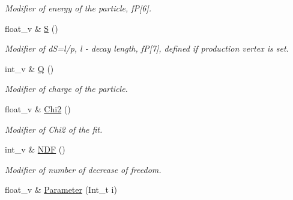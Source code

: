 \begin{DoxyCompactItemize}
\begin{DoxyCompactList}\small\item\em Modifier of energy of the particle, fP\mbox{[}6\mbox{]}. \end{DoxyCompactList}\item 
float\+\_\+v \& \hyperlink{classKFParticleBaseSIMD_ad15ac850401a548df731453f35db64dd}{S} ()\hypertarget{classKFParticleBaseSIMD_ad15ac850401a548df731453f35db64dd}{}\label{classKFParticleBaseSIMD_ad15ac850401a548df731453f35db64dd}

\begin{DoxyCompactList}\small\item\em Modifier of dS=l/p, l -\/ decay length, fP\mbox{[}7\mbox{]}, defined if production vertex is set. \end{DoxyCompactList}\item 
int\+\_\+v \& \hyperlink{classKFParticleBaseSIMD_a710ce08809b254aac583349705151973}{Q} ()\hypertarget{classKFParticleBaseSIMD_a710ce08809b254aac583349705151973}{}\label{classKFParticleBaseSIMD_a710ce08809b254aac583349705151973}

\begin{DoxyCompactList}\small\item\em Modifier of charge of the particle. \end{DoxyCompactList}\item 
float\+\_\+v \& \hyperlink{classKFParticleBaseSIMD_ae203be3b49c5af07d2ee3d895a2f21dc}{Chi2} ()\hypertarget{classKFParticleBaseSIMD_ae203be3b49c5af07d2ee3d895a2f21dc}{}\label{classKFParticleBaseSIMD_ae203be3b49c5af07d2ee3d895a2f21dc}

\begin{DoxyCompactList}\small\item\em Modifier of Chi2 of the fit. \end{DoxyCompactList}\item 
int\+\_\+v \& \hyperlink{classKFParticleBaseSIMD_a7e8c6fe04118c9dce503cea711011ee0}{N\+DF} ()\hypertarget{classKFParticleBaseSIMD_a7e8c6fe04118c9dce503cea711011ee0}{}\label{classKFParticleBaseSIMD_a7e8c6fe04118c9dce503cea711011ee0}

\begin{DoxyCompactList}\small\item\em Modifier of number of decrease of freedom. \end{DoxyCompactList}\item 
float\+\_\+v \& \hyperlink{classKFParticleBaseSIMD_ad876a667b7e64c2177a7b06866c3260c}{Parameter} (Int\+\_\+t i)\hypertarget{classKFParticleBaseSIMD_ad876a667b7e64c2177a7b06866c3260c}{}\label{classKFParticleBaseSIMD_ad876a667b7e64c2177a7b06866c3260c}


\end{DoxyCompactItemize}
